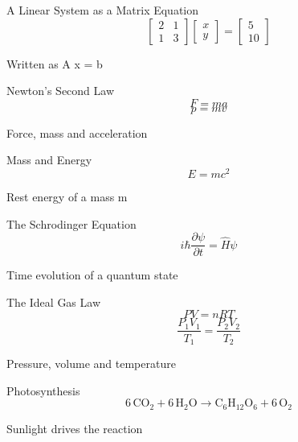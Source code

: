 \documentclass[aspectratio=169]{beamer}
\begin{document}
\begin{frame}{A Linear System as a Matrix Equation}
\centering
\label{eq008}{\huge \[ \begin{bmatrix} 2 & 1 \\ 1 & 3 \end{bmatrix}\begin{bmatrix} x \\ y \end{bmatrix} = \begin{bmatrix} 5 \\ 10 \end{bmatrix} \]}
\vspace{0.6em}

{\small Written as A x = b}
\end{frame}
\begin{frame}{Newton's Second Law}
\centering
\label{eq009}{\Huge \[ F = ma \]}
\vspace{0.4em}
\label{eq010}{\Huge \[ p = mv \]}
\vspace{0.6em}

{\small Force, mass and acceleration}
\end{frame}
\begin{frame}{Mass and Energy}
\centering
\label{eq011}{\Huge \[ E = mc^2 \]}
\vspace{0.6em}

{\small Rest energy of a mass m}
\end{frame}
\begin{frame}{The Schrodinger Equation}
\centering
\label{eq012}{\Huge \[ i\hbar \frac{\partial \psi}{\partial t} = \hat{H}\psi \]}
\vspace{0.6em}

{\small Time evolution of a quantum state}
\end{frame}
\begin{frame}{The Ideal Gas Law}
\centering
\label{eq013}{\Huge \[ PV = nRT \]}
\vspace{0.4em}
\label{eq014}{\Large \[ \frac{P_1 V_1}{T_1} = \frac{P_2 V_2}{T_2} \]}
\vspace{0.6em}

{\small Pressure, volume and temperature}
\end{frame}
\begin{frame}{Photosynthesis}
\centering
\label{eq015}{\huge \[ 6\,\mathrm{CO_2} + 6\,\mathrm{H_2O} \longrightarrow \mathrm{C_6H_{12}O_6} + 6\,\mathrm{O_2} \]}
\vspace{0.6em}

{\small Sunlight drives the reaction}
\end{frame}
\end{document}
